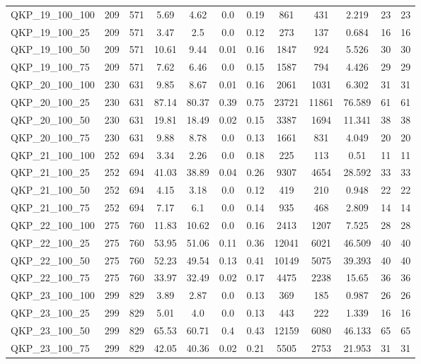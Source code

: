 \begin{table}[!h]
{\begin{tabular}{lccccccccccc}
QKP\_19\_100\_100 & 209 & 571 & 5.69 & 4.62 & 0.0 & 0.19 & 861 & 431 & 2.219 & 23 & 23\\
QKP\_19\_100\_25 & 209 & 571 & 3.47 & 2.5 & 0.0 & 0.12 & 273 & 137 & 0.684 & 16 & 16\\
QKP\_19\_100\_50 & 209 & 571 & 10.61 & 9.44 & 0.01 & 0.16 & 1847 & 924 & 5.526 & 30 & 30\\
QKP\_19\_100\_75 & 209 & 571 & 7.62 & 6.46 & 0.0 & 0.15 & 1587 & 794 & 4.426 & 29 & 29\\
QKP\_20\_100\_100 & 230 & 631 & 9.85 & 8.67 & 0.01 & 0.16 & 2061 & 1031 & 6.302 & 31 & 31\\
QKP\_20\_100\_25 & 230 & 631 & 87.14 & 80.37 & 0.39 & 0.75 & 23721 & 11861 & 76.589 & 61 & 61\\
QKP\_20\_100\_50 & 230 & 631 & 19.81 & 18.49 & 0.02 & 0.15 & 3387 & 1694 & 11.341 & 38 & 38\\
QKP\_20\_100\_75 & 230 & 631 & 9.88 & 8.78 & 0.0 & 0.13 & 1661 & 831 & 4.049 & 20 & 20\\
QKP\_21\_100\_100 & 252 & 694 & 3.34 & 2.26 & 0.0 & 0.18 & 225 & 113 & 0.51 & 11 & 11\\
QKP\_21\_100\_25 & 252 & 694 & 41.03 & 38.89 & 0.04 & 0.26 & 9307 & 4654 & 28.592 & 33 & 33\\
QKP\_21\_100\_50 & 252 & 694 & 4.15 & 3.18 & 0.0 & 0.12 & 419 & 210 & 0.948 & 22 & 22\\
QKP\_21\_100\_75 & 252 & 694 & 7.17 & 6.1 & 0.0 & 0.14 & 935 & 468 & 2.809 & 14 & 14\\
QKP\_22\_100\_100 & 275 & 760 & 11.83 & 10.62 & 0.0 & 0.16 & 2413 & 1207 & 7.525 & 28 & 28\\
QKP\_22\_100\_25 & 275 & 760 & 53.95 & 51.06 & 0.11 & 0.36 & 12041 & 6021 & 46.509 & 40 & 40\\
QKP\_22\_100\_50 & 275 & 760 & 52.23 & 49.54 & 0.13 & 0.41 & 10149 & 5075 & 39.393 & 40 & 40\\
QKP\_22\_100\_75 & 275 & 760 & 33.97 & 32.49 & 0.02 & 0.17 & 4475 & 2238 & 15.65 & 36 & 36\\
QKP\_23\_100\_100 & 299 & 829 & 3.89 & 2.87 & 0.0 & 0.13 & 369 & 185 & 0.987 & 26 & 26\\
QKP\_23\_100\_25 & 299 & 829 & 5.01 & 4.0 & 0.0 & 0.13 & 443 & 222 & 1.339 & 16 & 16\\
QKP\_23\_100\_50 & 299 & 829 & 65.53 & 60.71 & 0.4 & 0.43 & 12159 & 6080 & 46.133 & 65 & 65\\
QKP\_23\_100\_75 & 299 & 829 & 42.05 & 40.36 & 0.02 & 0.21 & 5505 & 2753 & 21.953 & 31 & 31\\

\end{tabular}}
\end{table}
